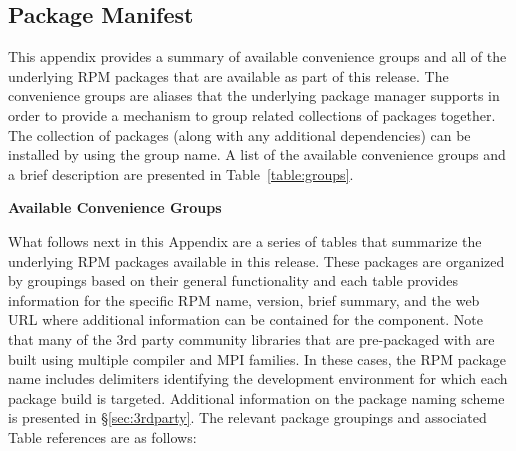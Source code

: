 \clearpage

\newcommand{\captionSpace}{-0.15cm}
\newcommand{\tabSpaceBot}{1.0cm}
\captionsetup{justification=raggedright,singlelinecheck=false}

\subsection{Package Manifest} \label {appendix:manifest}

\vspace*{0.25cm}
This appendix provides a summary of available convenience groups and all of the
underlying RPM packages that are available as part of this \OHPC{} release. The
convenience groups are aliases that the underlying package manager supports in
order to provide a mechanism to group related collections of packages
together. The collection of packages (along with any additional dependencies)
can be installed by using the group name. A list of the available convenience
groups and a brief description are presented in Table~\ref{table:groups}.

\vspace*{1.25cm}
\begin{table}[h] 
\caption{\bf Available \OHPC{} Convenience Groups} \vspace*{\captionSpace{}}
\label{table:groups}

\end{table}

\newpage
What follows next in this Appendix are a series of tables that summarize the
underlying RPM packages available in this \OHPC{} release. These packages are
organized by groupings based on their general functionality and each table
provides information for the specific RPM name, version, brief summary, and the
web URL where additional information can be contained for the component. Note
that many of the 3rd party community libraries that are pre-packaged
with \OHPC{} are built using multiple compiler and MPI families. In these cases,
the RPM package name includes delimiters identifying the development
environment for which each package build is targeted.  Additional information
on the \OHPC{} package naming scheme is presented in \S\ref{sec:3rdparty}. 
The relevant package groupings and associated Table references are as follows:

\vspace*{0.1cm}

